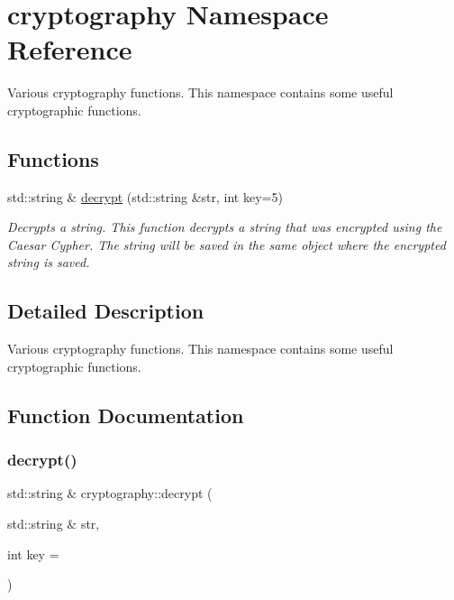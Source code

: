 \hypertarget{namespacecryptography}{}\section{cryptography Namespace Reference}
\label{namespacecryptography}


Various cryptography functions. This namespace contains some useful cryptographic functions.  


\subsection*{Functions}
\begin{DoxyCompactItemize}
\item 
std\+::string \& \mbox{\hyperlink{namespacecryptography_ab347f0a8dfb7d890098285a474fce5b9}{decrypt}} (std\+::string \&str, int key=5)
\begin{DoxyCompactList}\small\item\em Decrypts a string. This function decrypts a string that was encrypted using the Caesar Cypher. The string will be saved in the same object where the encrypted string is saved. \end{DoxyCompactList}\end{DoxyCompactItemize}


\subsection{Detailed Description}
Various cryptography functions. This namespace contains some useful cryptographic functions. 

\subsection{Function Documentation}
\mbox{\label{namespacecryptography_ab347f0a8dfb7d890098285a474fce5b9}} 
\subsubsection{\texorpdfstring{decrypt()}{decrypt()}}
{\footnotesize\ttfamily std\+::string \& cryptography\+::decrypt (\begin{DoxyParamCaption}\item[{std\+::string \&}]{str,  }\item[{int}]{key = {} }\end{DoxyParamCaption})}



